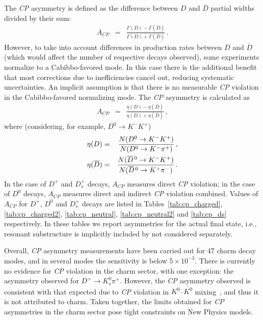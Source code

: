 \vspace{0.8cm}
The \emph{CP} asymmetry is defined as the difference between 
$D$ and $\overline{D}$ partial widths divided by their sum:
\begin{eqnarray}  
A_{CP} & = & \frac{\Gamma(D)-\Gamma(\overline{D})}
{\Gamma(D)+\Gamma(\overline{D})}\,.
\end{eqnarray}
However, to take into account differences in production rates between 
$D$ and $\overline{D}$ (which would affect the number of respective 
decays observed), some experiments normalize to a Cabibbo-favored 
mode. In this case there is the additional benefit that most corrections 
due to inefficiencies cancel out, reducing systematic uncertainties. An 
implicit assumption is that there is no measurable \emph{CP} 
violation in the Cabibbo-favored normalizing mode. 
The \emph{CP} asymmetry is calculated as
\begin{eqnarray}
A_{CP} & = & \frac{\eta(D)-\eta(\overline{D})}{\eta(D)+\eta(\overline{D})}\,,
\end{eqnarray}
where (considering, for example, $D^0 \to K^-K^+$)
\begin{eqnarray}
 \eta(D) & = & \frac{N(D^0 \rightarrow K^-K^+)}{N(D^0 \rightarrow K^-\pi^+)}\,, \\
 \eta(\overline{D}) & = & \frac{N(\overline{D}{}^{\,0}\rightarrow K^-K^+)}
{N(\overline{D}{}^{\,0}\rightarrow K^+\pi^-)}\,.
\end{eqnarray}
In the case of $D^+$ and $D^+_s$ decays, $A^{}_{CP}$ measures 
direct \emph{CP} violation; in the case of $D^0$ decays, $A^{}_{CP}$ 
measures direct and indirect \emph{CP} violation combined.
Values of $A^{}_{CP}$ for $D^+$, $D^0$ and $D_s^+$ decays are listed in
Tables~\ref{tab:cp_charged}, \ref{tab:cp_charged2}, \ref{tab:cp_neutral}, \ref{tab:cp_neutral2} and \ref{tab:cp_ds} respectively.
In these tables we report asymmetries for the actual
final state, i.e., resonant substructure is implicitly 
included by not considered separately.

Overall, \emph{CP} asymmetry measurements have been
carried out for 47 charm decay modes, and in
several modes the sensitivity is below $5 \times 10^{-3}$. 
There is currently no evidence for \emph{CP} violation in
the charm sector, with one exception: the asymmetry
observed for $D^+ \to K^0_s\pi^+$. 
However, the \emph{CP} asymmetry observed is consistent
with that expected due to \emph{CP} violation in
$K^0$--$\overline{K^0}$ mixing~\cite{Grossman:2012aa},
and thus it is not attributed to charm.
%
Taken together, the limits obtained for \emph{CP} asymmetries 
in the charm sector pose tight constraints on New Physics models.

